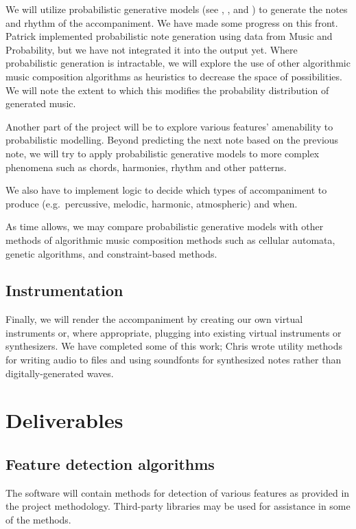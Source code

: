 \documentclass[11pt,conference,letterpaper]{IEEEtran}
\begin{document}
We will utilize probabilistic generative models (see \cite{temperly2007mprob}, \cite{conklin2003music}, and \cite{mccormack1996grammar}) to generate the notes and rhythm of the accompaniment. We have made some progress on this front. Patrick implemented probabilistic note generation using data from Music and Probability, but we have not integrated it into the output yet. Where probabilistic generation is intractable, we will explore the use of other algorithmic music composition algorithms as heuristics to decrease the space of possibilities. We will note the extent to which this modifies the probability distribution of generated music.

Another part of the project will be to explore various features’ amenability to probabilistic modelling. Beyond predicting the next note based on the previous note, we will try to apply probabilistic generative models to more complex phenomena such as chords, harmonies, rhythm and other patterns.

We also have to implement logic to decide which types of accompaniment to produce (e.g.\ percussive, melodic, harmonic, atmospheric) and when.

As time allows, we may compare probabilistic generative models with other methods of algorithmic music composition methods such as cellular automata, genetic algorithms, and constraint-based methods.

\subsection{Instrumentation}

Finally, we will render the accompaniment by creating our own virtual instruments or, where appropriate, plugging into existing virtual instruments or synthesizers. We have completed some of this work; Chris wrote utility methods for writing audio to files and using soundfonts for synthesized notes rather than digitally-generated waves.

\section{Deliverables}

\subsection{Feature detection algorithms}

The software will contain methods for detection of various features as provided in the project methodology. Third-party libraries may be used for assistance in some of the methods.
\end{document}
